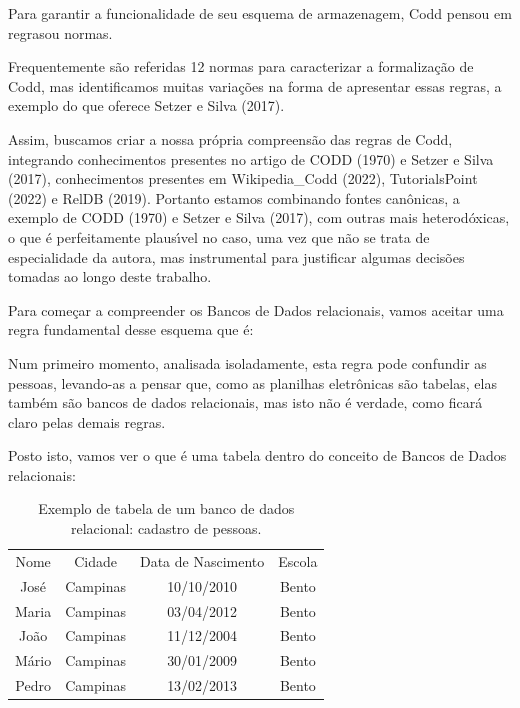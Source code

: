 \documentclass[
12pt,		%
openright,	%
twoside,  %
a4paper,			%
chapter=TITLE,		%
english,			%
french,				%
spanish,			%
brazil				%
]{USPSC-classe/USPSC}
\begin{document}
Para garantir a funcionalidade de seu esquema de armazenagem, Codd pensou em \textquotedbl regras\textquotedbl  ou normas.


Frequentemente s\~ao referidas 12 normas para caracterizar a formaliza\c{c}\~ao de Codd, mas identificamos muitas varia\c{c}\~oes na forma de apresentar essas regras, a exemplo do que oferece Setzer e Silva (2017).


Assim, buscamos criar a nossa pr\'opria compreens\~ao das regras de Codd, integrando conhecimentos presentes no artigo de  CODD (1970) e  Setzer e Silva (2017), conhecimentos presentes em Wikipedia\_Codd (2022),  TutorialsPoint (2022) e  RelDB (2019). Portanto estamos combinando fontes can\^onicas, a exemplo de  CODD (1970) e Setzer e Silva (2017), com outras mais heterod\'oxicas, o que \'e perfeitamente plaus\'{\i}vel no caso, uma vez que n\~ao se trata de especialidade da autora, mas instrumental para justificar algumas decis\~oes tomadas ao longo deste trabalho.


Para come\c{c}ar a compreender os Bancos de Dados relacionais, vamos aceitar uma regra fundamental desse esquema que \'e:



\noindent\begin{center}\mbox{\centering{}}\end{center}


Num primeiro momento, analisada isoladamente, esta regra pode confundir as pessoas, levando-as a pensar que, como as planilhas eletr\^onicas s\~ao tabelas, elas tamb\'em s\~ao bancos de dados relacionais, mas isto n\~ao \'e verdade, como ficar\'a claro pelas demais regras.


Posto isto, vamos ver o que \'e uma tabela dentro do conceito de Bancos de Dados relacionais:






\begin{table}[htb]
\tiny
\caption{\label{f66c1ac239a347d2b455611f794c18300b1974b6}Exemplo de tabela de um banco de dados relacional: cadastro de pessoas.}

\centering
\begin{tabular}{|c|c|c|c|}
\hline
Nome  &  Cidade  &  Data de Nascimento  &  Escola \\
Jos\'e  &  Campinas  &  10/10/2010  &  Bento \\
Maria  &  Campinas  &  03/04/2012  &  Bento \\
Jo\~ao  &  Campinas  &  11/12/2004  &  Bento \\
M\'ario  &  Campinas  &  30/01/2009  &  Bento \\
Pedro  &  Campinas  &  13/02/2013  &  Bento \\
\hline
\end{tabular}
\end{table}
\end{document}
